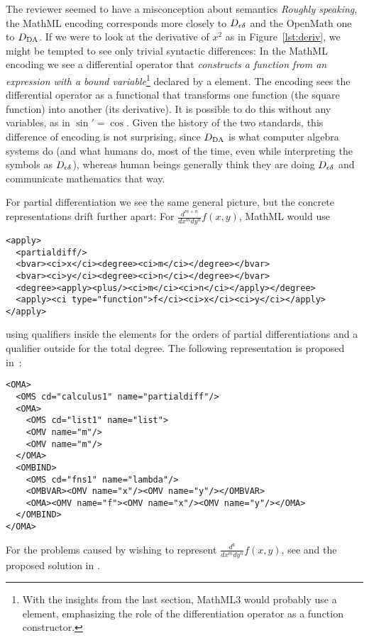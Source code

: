 \documentclass{llncs}
\begin{document}
\begin{newpart}{The reviewer seemed to have a misconception about semantics}
{\emph{Roughly speaking}}, the MathML encoding corresponds more closely to $D_{\epsilon\delta}$ and the
OpenMath one to $D_{\rm DA}$. If we were to look at the derivative of $x^2$ as in
Figure~\ref{lst:deriv}, we might be tempted to see only trivial syntactic differences: In
the MathML encoding we see a differential operator that {\emph{constructs a function from
    an expression with a bound variable}}\footnote{With the insights from the last
  section, MathML3 would probably use a {} element, emphasizing the role of
  the differentiation operator as a function constructor.} declared by a {}
element.  The {\openmath} encoding sees the differential operator as a functional that
transforms one function (the square function) into another (its derivative).  It is
possible to do this without any variables, as in $\sin'=\cos$.  Given the history of the
two standards, this difference of encoding is not surprising, since $D_{\rm DA}$ is what
computer algebra systems do (and what humans do, most of the time, even while interpreting
the symbols as $D_{\epsilon\delta}$), whereas human beings generally think they are doing $D_{\epsilon\delta}$ and
communicate mathematics that way.

For partial differentiation we see the same general picture, but the concrete
representations drift further apart: For $\frac{d^{m+n}}{dx^m dy^n}f(x,y)$, MathML would
use
\begin{lstlisting}[language=MathML2]
<apply>
  <partialdiff/>
  <bvar><ci>x</ci><degree><ci>m</ci></degree></bvar>
  <bvar><ci>y</ci><degree><ci>n</ci></degree></bvar>
  <degree><apply><plus/><ci>m</ci><ci>n</ci></apply></degree>
  <apply><ci type="function">f</ci><ci>x</ci><ci>y</ci></apply>
</apply>
\end{lstlisting}
using {} qualifiers inside the {} elements for the orders of
partial differentiations and a {} qualifier outside for the total
degree. The following representation is proposed in~\cite{CarDAvDew:cbmao01}:
\begin{lstlisting}[language=OpenMath]
<OMA>
  <OMS cd="calculus1" name="partialdiff"/>
  <OMA>
    <OMS cd="list1" name="list">
    <OMV name="m"/>
    <OMV name="m"/>
  </OMA>
  <OMBIND>
    <OMS cd="fns1" name="lambda"/>
    <OMBVAR><OMV name="x"/><OMV name="y"/></OMBVAR>
    <OMA><OMV name="f"><OMV name="x"/><OMV name="y"/></OMA>
  </OMBIND>
</OMA>
\end{lstlisting}
For the problems caused by wishing to represent $\frac{d^k}{dx^m dy^n}f(x,y)$, see
\cite{Kohlhase2008} and the proposed solution in \cite{DavenportKohlhase2009d}.


\end{newpart}
\end{document}
